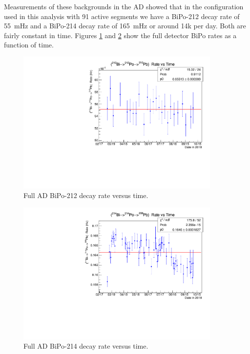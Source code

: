 Measurements of these backgrounds in the AD showed that in the configuration used in this analysis with 91 active segments we have a BiPo-212 decay rate of 55~mHz and a BiPo-214 decay rate of 165~mHz or around 14k per day. Both are fairly constant in time. Figures \ref{fig:BiPo212RatevsT} and \ref{fig:BiPo214RatevsT} show the full detector BiPo rates as a function of time.

\begin{figure}[!h]
\centering
\includegraphics[width=0.9\textwidth]{figures/BiPo212RatevsT.pdf}
\caption{\label{fig:BiPo212RatevsT}Full AD BiPo-212 decay rate versus time.}
\end{figure}

\begin{figure}[!h]
\centering
\includegraphics[width=0.9\textwidth]{figures/BiPo214RatevsT.pdf}
\caption{\label{fig:BiPo214RatevsT}Full AD BiPo-214 decay rate versus time. }
\end{figure}

